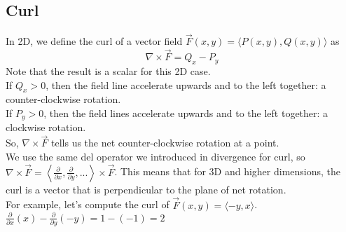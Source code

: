 \subsection{Curl}
\noindent
In 2D, we define the curl of a vector field $\vec{F}(x,y)=\langle P(x,y), Q(x,y)\rangle$ as\\
$$\nabla\times\vec{F}=Q_x-P_y$$
Note that the result is a scalar for this 2D case.\\
If $Q_x >0$, then the field line accelerate upwards and to the left together: a counter-clockwise rotation.\\
If $P_y >0$, then the field lines accelerate upwards and to the left together: a clockwise rotation.\\
So, $\nabla\times\vec{F}$ tells us the net counter-clockwise rotation at a point.\\

\noindent
We use the same del operator we introduced in divergence for curl, so $\nabla\times\vec{F}=\left<\frac{\partial}{\partial x},\frac{\partial}{\partial y},...\right>\times\vec{F}$. This means that for 3D and higher dimensions, the curl is a vector that is perpendicular to the plane of net rotation.\\

\noindent
For example, let's compute the curl of $\vec{F}(x,y)=\langle -y, x\rangle$.\\
\indent
$\frac{\partial}{\partial x}(x)-\frac{\partial}{\partial y}(-y)=1-(-1)=2$\\


